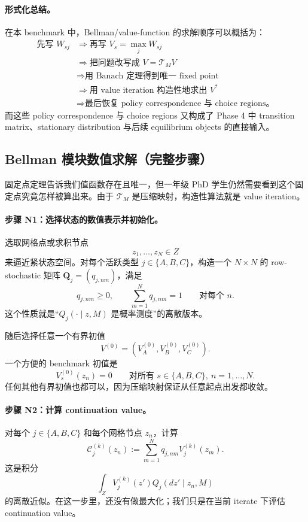 \paragraph{形式化总结。}
在本 benchmark 中，Bellman/value-function 的求解顺序可以概括为：
\begin{align*}
\text{先写 }W_{sj}
&\Longrightarrow
\text{再写 }V_s=\max_j W_{sj}\\
&\Longrightarrow
\text{把问题改写成 }V=\mathcal T_MV\\
&\Longrightarrow
\text{用 Banach 定理得到唯一 fixed point}\\
&\Longrightarrow
\text{用 value iteration 构造性地求出 }V^*\\
&\Longrightarrow
\text{最后恢复 policy correspondence 与 choice regions。}
\end{align*}
而这些 policy correspondence 与 choice regions 又构成了 Phase 4 中 transition matrix、stationary distribution 与后续 equilibrium objects 的直接输入。

\subsection{Bellman 模块数值求解（完整步骤）}

固定点定理告诉我们值函数存在且唯一，但一年级 PhD 学生仍然需要看到这个固定点究竟怎样被算出来。由于 $\mathcal T_M$ 是压缩映射，构造性算法就是 value iteration。

\paragraph{步骤 N1：选择状态的数值表示并初始化。}
选取网格点或求积节点
\[
z_1,\dots,z_N\in Z
\]
来逼近紧状态空间。对每个活跃类型 $j\in\{A,B,C\}$，构造一个 $N\times N$ 的 row-stochastic 矩阵 $\mathbf Q_j=(q_{j,nm})$，满足
\[
q_{j,nm}\ge 0,
\qquad
\sum_{m=1}^N q_{j,nm}=1
\qquad\text{对每个 }n.
\]
这个性质就是“$Q_j(\cdot\mid z,M)$ 是概率测度”的离散版本。

随后选择任意一个有界初值
\[
V^{(0)}=(V_A^{(0)},V_B^{(0)},V_C^{(0)}).
\]
一个方便的 benchmark 初值是
\[
V_s^{(0)}(z_n)=0
\qquad\text{对所有 }s\in\{A,B,C\},\ n=1,\dots,N.
\]
任何其他有界初值也都可以，因为压缩映射保证从任意起点出发都收敛。

\paragraph{步骤 N2：计算 continuation value。}
对每个 $j\in\{A,B,C\}$ 和每个网格节点 $z_n$，计算
\[
\mathcal C_j^{(k)}(z_n):=\sum_{m=1}^N q_{j,nm}V_j^{(k)}(z_m).
\]
这是积分
\[
\int_Z V_j^{(k)}(z')Q_j(dz'\mid z_n,M)
\]
的离散近似。在这一步里，还没有做最大化；我们只是在当前 iterate 下评估 continuation value。

